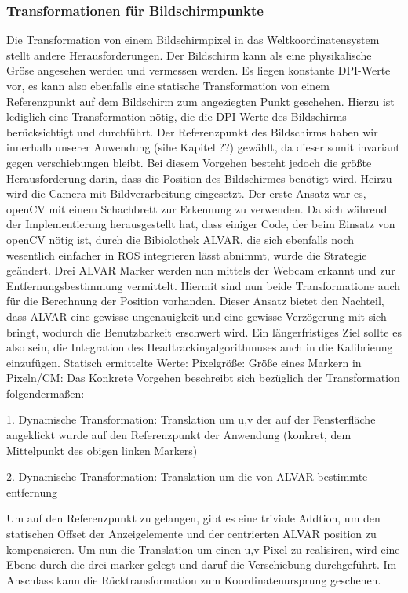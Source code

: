 \subsubsection{Transformationen für Bildschirmpunkte}
\label{ssection:alva}
Die Transformation von einem Bildschirmpixel in das Weltkoordinatensystem stellt andere Herausforderungen. Der Bildschirm kann als eine physikalische Gröse angesehen werden und vermessen werden. Es liegen konstante DPI-Werte vor, es kann also ebenfalls eine statische Transformation von einem Referenzpunkt auf dem Bildschirm zum angeziegten Punkt geschehen. Hierzu ist lediglich eine Transformation nötig, die die DPI-Werte des Bildschirms berücksichtigt und durchführt. Der Referenzpunkt des Bildschirms haben wir innerhalb unserer Anwendung (sihe Kapitel ??) gewählt, da dieser somit invariant gegen verschiebungen bleibt. Bei diesem Vorgehen besteht jedoch die größte Herausforderung darin, dass die Position des Bildschirmes benötigt wird. Heirzu wird die Camera mit Bildverarbeitung eingesetzt. Der erste Ansatz war es, openCV mit einem Schachbrett zur Erkennung zu verwenden. Da sich während der Implementierung herausgestellt hat, dass einiger Code, der beim Einsatz von openCV nötig ist, durch die Bibiolothek ALVAR, die sich ebenfalls noch wesentlich einfacher in ROS integrieren lässt abnimmt, wurde die Strategie geändert. Drei ALVAR Marker werden nun mittels der Webcam erkannt und zur Entfernungsbestimmung vermittelt. Hiermit sind nun beide Transformatione auch für die Berechnung der Position vorhanden. Dieser Ansatz bietet den Nachteil, dass ALVAR eine gewisse ungenauigkeit und eine gewisse Verzögerung mit sich bringt, wodurch die Benutzbarkeit erschwert wird. Ein längerfristiges Ziel sollte es also sein, die Integration des Headtrackingalgorithmuses auch in die Kalibrieung einzufügen.
    Statisch ermittelte Werte:
    Pixelgröße:
    Größe eines Markern in Pixeln/CM:
Das Konkrete Vorgehen beschreibt sich bezüglich der Transformation folgendermaßen:

    1. Dynamische Transformation:  Translation  um u,v der auf der Fensterfläche angeklickt wurde auf den Referenzpunkt der Anwendung (konkret, dem Mittelpunkt des obigen linken Markers) 

    2. Dynamische Transformation: Translation um die von ALVAR bestimmte entfernung

Um auf den Referenzpunkt zu gelangen, gibt es eine triviale Addtion, um den statischen Offset der Anzeigelemente und der centrierten ALVAR position zu kompensieren. Um nun die Translation um einen u,v Pixel zu realisiren, wird eine Ebene durch die drei marker gelegt und daruf die Verschiebung durchgeführt. Im Anschlass kann die Rücktransformation zum Koordinatenursprung geschehen.

